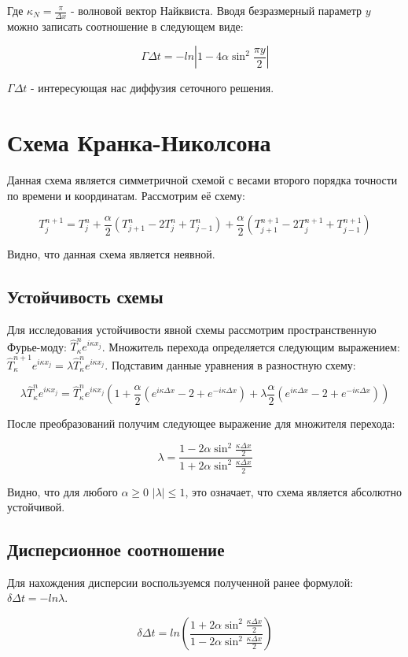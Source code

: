 \documentclass[diploma]{nanolab2015}
\begin{document}
Где $\kappa_N = \frac{\pi}{\Delta x}$ - волновой вектор Найквиста. Вводя безразмерный параметр $y$ можно записать соотношение в следующем виде:

$$\Gamma \Delta t = - ln|1-4\alpha \sin^2\frac{\pi y}{2}|$$

$\Gamma \Delta t$ - интересующая нас диффузия сеточного решения.

\section{Схема Кранка-Николсона}
Данная схема является симметричной схемой с весами второго порядка точности по времени и координатам. Рассмотрим её схему:

$$T^{n+1}_{j} = T^{n}_{j} + \frac{\alpha}{2} (T^{n}_{j+1} -2T^{n}_{j}+T^{n}_{j-1})+\frac{\alpha}{2} (T^{n+1}_{j+1} -2T^{n+1}_{j}+T^{n+1}_{j-1})$$

Видно, что данная схема является неявной.

\subsection{Устойчивость схемы}
Для исследования устойчивости явной схемы рассмотрим пространственную Фурье-моду: $\hat{T}^n_\kappa e^{i \kappa x_j}$. Множитель перехода определяется следующим выражением: $\hat{T}^{n+1}_\kappa e^{i \kappa x_j}=\lambda \hat{T}^n_\kappa e^{i \kappa x_j}$. Подставим данные уравнения в разностную схему:

$$\lambda \hat{T}^n_\kappa e^{i \kappa x_j} = \hat{T}^n_\kappa e^{i \kappa x_j}(1+\frac{\alpha}{2}(e^{i \kappa \Delta x}-2+e^{-i \kappa \Delta x})+\lambda \frac{\alpha}{2}(e^{i \kappa \Delta x}-2+e^{-i \kappa \Delta x}))$$

После преобразований получим следующее выражение для множителя перехода:

$$\lambda = \frac{1-2\alpha \sin^2 \frac{\kappa \Delta x}{2}}{1+2\alpha \sin^2 \frac{\kappa \Delta x}{2}}$$

Видно, что для любого $\alpha \geq 0$ $|\lambda| \leq 1$, это означает, что схема является абсолютно устойчивой.

\subsection{Дисперсионное соотношение}
Для нахождения дисперсии воспользуемся полученной ранее формулой: $\delta \Delta t = - ln \lambda$. 

$$\delta \Delta t = ln \left( \frac{1+2 \alpha \sin^2 \frac{\kappa \Delta x}{2}}{1-2 \alpha \sin^2 \frac{\kappa \Delta x}{2}}\right)$$
\end{document}
